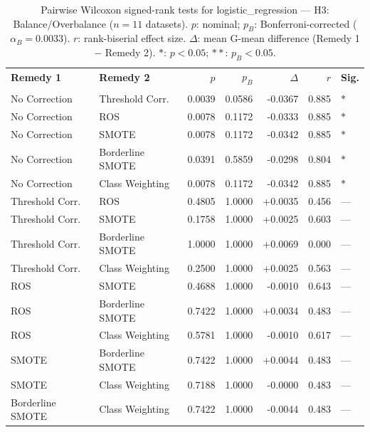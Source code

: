\begin{table}[ht]
\centering
\scriptsize
\caption{Pairwise Wilcoxon signed-rank tests for logistic_regression --- H3: Balance/Overbalance ($n=11$ datasets). $p$: nominal; $p_B$: Bonferroni-corrected ($\alpha_B=0.0033$). $r$: rank-biserial effect size. $\Delta$: mean G-mean difference (Remedy 1 $-$ Remedy 2). $\ast$: $p<0.05$; $\ast\ast$: $p_B<0.05$.}
\label{tab:wilcoxon_logistic_regression_h3}
\begin{tabular}{llrrrrl}
\toprule
\textbf{Remedy 1} & \textbf{Remedy 2} & \textbf{$p$} & \textbf{$p_B$} & \textbf{$\Delta$} & \textbf{$r$} & \textbf{Sig.} \\\\
\midrule
    No Correction & Threshold Corr. & 0.0039 & 0.0586 & -0.0367 & 0.885 & $\ast$ \\
    No Correction & ROS & 0.0078 & 0.1172 & -0.0333 & 0.885 & $\ast$ \\
    No Correction & SMOTE & 0.0078 & 0.1172 & -0.0342 & 0.885 & $\ast$ \\
    No Correction & Borderline SMOTE & 0.0391 & 0.5859 & -0.0298 & 0.804 & $\ast$ \\
    No Correction & Class Weighting & 0.0078 & 0.1172 & -0.0342 & 0.885 & $\ast$ \\
    Threshold Corr. & ROS & 0.4805 & 1.0000 & +0.0035 & 0.456 & --- \\
    Threshold Corr. & SMOTE & 0.1758 & 1.0000 & +0.0025 & 0.603 & --- \\
    Threshold Corr. & Borderline SMOTE & 1.0000 & 1.0000 & +0.0069 & 0.000 & --- \\
    Threshold Corr. & Class Weighting & 0.2500 & 1.0000 & +0.0025 & 0.563 & --- \\
    ROS & SMOTE & 0.4688 & 1.0000 & -0.0010 & 0.643 & --- \\
    ROS & Borderline SMOTE & 0.7422 & 1.0000 & +0.0034 & 0.483 & --- \\
    ROS & Class Weighting & 0.5781 & 1.0000 & -0.0010 & 0.617 & --- \\
    SMOTE & Borderline SMOTE & 0.7422 & 1.0000 & +0.0044 & 0.483 & --- \\
    SMOTE & Class Weighting & 0.7188 & 1.0000 & -0.0000 & 0.483 & --- \\
    Borderline SMOTE & Class Weighting & 0.7422 & 1.0000 & -0.0044 & 0.483 & --- \\
\bottomrule
\end{tabular}
\end{table}